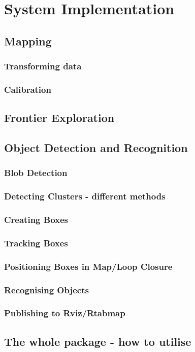\documentclass{mproj}
\begin{document}
\chapter{System Implementation}
\section{Mapping}
\subsection{Transforming data}
\subsection{Calibration}
\section{Frontier Exploration}
\section{Object Detection and Recognition}
\subsection{Blob Detection}
\subsection{Detecting Clusters - different methods}
\subsection{Creating Boxes}
\subsection{Tracking Boxes}
\subsection{Positioning Boxes in Map/Loop Closure}
\subsection{Recognising Objects}
\subsection{Publishing to Rviz/Rtabmap}
\section{The whole package - how to utilise}
\end{document}

